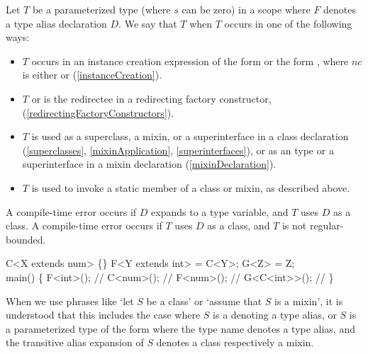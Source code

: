 \documentclass[makeidx]{article}
\begin{document}
{\LMHash{}%
%
Let $T$ be a parameterized type 
(where $s$ can be zero)
in a scope where $F$ denotes a type alias declaration $D$.
We say that $T$
when $T$ occurs in one of the following ways:

\begin{itemize}
\item
  $T$ occurs in an instance creation expression of the form
   or the form ,
  where $nc$ is either \NEW{} or \CONST{}
  (\ref{instanceCreation}).
\item
  $T$ or  is the redirectee in a redirecting factory constructor,
  (\ref{redirectingFactoryConstructors}).
\item
  $T$ is used as a superclass, a mixin, or a superinterface
  in a class declaration
  (\ref{superclasses}, \ref{mixinApplication}, \ref{superinterfaces}),
  or as an \ON{} type or a superinterface in a mixin declaration
  (\ref{mixinDeclaration}).
\item
  $T$ is used to invoke a static member of a class or mixin,
  as described above.
\end{itemize}

\LMHash{}%
A compile-time error occurs if $D$ expands to a type variable,
and $T$ uses $D$ as a class.
A compile-time error occurs if $T$ uses $D$ as a class,
and $T$ is not regular-bounded.

\begin{dartCode}
\CLASS{} C<X extends num> \{\}
\TYPEDEF{} F<Y extends int> = C<Y>;
\TYPEDEF{} G<Z> = Z;
\\
\VOID{} main() \{
  F<int>(); // 
  C<num>(); // 
  F<num>(); // 
  G<C<int>{}>(); // 
\}
\end{dartCode}

\LMHash{}%
When we use phrases like `let $S$ be a class' or `assume that $S$ is a mixin',
it is understood that this includes the case where
$S$ is a  denoting a type alias, or
$S$ is a parameterized type of the form
where the type name denotes a type alias,
and the transitive alias expansion of $S$ denotes a class respectively a mixin.


}
\end{document}
